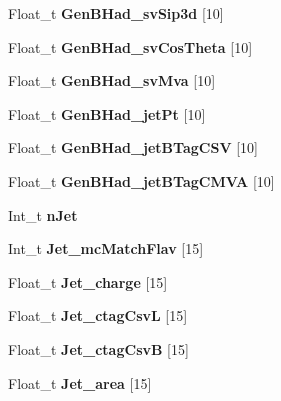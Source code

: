 \begin{DoxyCompactItemize}
Float\+\_\+t {\bfseries Gen\+B\+Had\+\_\+sv\+Sip3d} \mbox{[}10\mbox{]}
\item 
\hypertarget{classMiniTree_a96be177fc58d5d10c7dd298223970a86}{}\label{classMiniTree_a96be177fc58d5d10c7dd298223970a86} 
Float\+\_\+t {\bfseries Gen\+B\+Had\+\_\+sv\+Cos\+Theta} \mbox{[}10\mbox{]}
\item 
\hypertarget{classMiniTree_af1db1777da98f4faab18d44168fb31c9}{}\label{classMiniTree_af1db1777da98f4faab18d44168fb31c9} 
Float\+\_\+t {\bfseries Gen\+B\+Had\+\_\+sv\+Mva} \mbox{[}10\mbox{]}
\item 
\hypertarget{classMiniTree_afb4e24bb7e4de5be22036400a47a643e}{}\label{classMiniTree_afb4e24bb7e4de5be22036400a47a643e} 
Float\+\_\+t {\bfseries Gen\+B\+Had\+\_\+jet\+Pt} \mbox{[}10\mbox{]}
\item 
\hypertarget{classMiniTree_a2e8bd787da2842e8fbea1ee1e92df9d5}{}\label{classMiniTree_a2e8bd787da2842e8fbea1ee1e92df9d5} 
Float\+\_\+t {\bfseries Gen\+B\+Had\+\_\+jet\+B\+Tag\+C\+SV} \mbox{[}10\mbox{]}
\item 
\hypertarget{classMiniTree_a144be1c6fddc44be2b4b5964aa31aa07}{}\label{classMiniTree_a144be1c6fddc44be2b4b5964aa31aa07} 
Float\+\_\+t {\bfseries Gen\+B\+Had\+\_\+jet\+B\+Tag\+C\+M\+VA} \mbox{[}10\mbox{]}
\item 
\hypertarget{classMiniTree_a83157609eda6fed76b31b83fef584f70}{}\label{classMiniTree_a83157609eda6fed76b31b83fef584f70} 
Int\+\_\+t {\bfseries n\+Jet}
\item 
\hypertarget{classMiniTree_a3286d8d776eeb346f5239cb55cf53d5a}{}\label{classMiniTree_a3286d8d776eeb346f5239cb55cf53d5a} 
Int\+\_\+t {\bfseries Jet\+\_\+mc\+Match\+Flav} \mbox{[}15\mbox{]}
\item 
\hypertarget{classMiniTree_af2e08249ec7d03076a41961f36c8b8c6}{}\label{classMiniTree_af2e08249ec7d03076a41961f36c8b8c6} 
Float\+\_\+t {\bfseries Jet\+\_\+charge} \mbox{[}15\mbox{]}
\item 
\hypertarget{classMiniTree_a68a7574908722b7fdc4858614d44419b}{}\label{classMiniTree_a68a7574908722b7fdc4858614d44419b} 
Float\+\_\+t {\bfseries Jet\+\_\+ctag\+CsvL} \mbox{[}15\mbox{]}
\item 
\hypertarget{classMiniTree_a7121c9cf425f10c8bdaa3391194ae3ab}{}\label{classMiniTree_a7121c9cf425f10c8bdaa3391194ae3ab} 
Float\+\_\+t {\bfseries Jet\+\_\+ctag\+CsvB} \mbox{[}15\mbox{]}
\item 
\hypertarget{classMiniTree_a678d181c12170ba9aa12c1d8a5e595f9}{}\label{classMiniTree_a678d181c12170ba9aa12c1d8a5e595f9} 
Float\+\_\+t {\bfseries Jet\+\_\+area} \mbox{[}15\mbox{]}

\end{DoxyCompactItemize}
